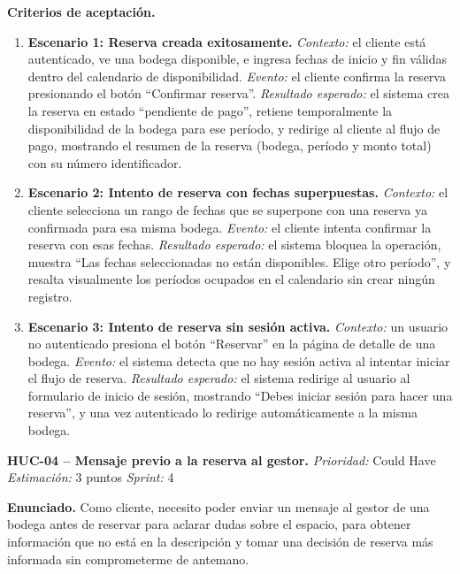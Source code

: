 \textbf{Criterios de aceptación.}
\begin{enumerate}
\item \textbf{Escenario 1: Reserva creada exitosamente.} \textit{Contexto:} el cliente está autenticado, ve una bodega disponible, e ingresa fechas de inicio y fin válidas dentro del calendario de disponibilidad. \textit{Evento:} el cliente confirma la reserva presionando el botón ``Confirmar reserva''. \textit{Resultado esperado:} el sistema crea la reserva en estado ``pendiente de pago'', retiene temporalmente la disponibilidad de la bodega para ese período, y redirige al cliente al flujo de pago, mostrando el resumen de la reserva (bodega, período y monto total) con su número identificador.
\item \textbf{Escenario 2: Intento de reserva con fechas superpuestas.} \textit{Contexto:} el cliente selecciona un rango de fechas que se superpone con una reserva ya confirmada para esa misma bodega. \textit{Evento:} el cliente intenta confirmar la reserva con esas fechas. \textit{Resultado esperado:} el sistema bloquea la operación, muestra ``Las fechas seleccionadas no están disponibles. Elige otro período'', y resalta visualmente los períodos ocupados en el calendario sin crear ningún registro.
\item \textbf{Escenario 3: Intento de reserva sin sesión activa.} \textit{Contexto:} un usuario no autenticado presiona el botón ``Reservar'' en la página de detalle de una bodega. \textit{Evento:} el sistema detecta que no hay sesión activa al intentar iniciar el flujo de reserva. \textit{Resultado esperado:} el sistema redirige al usuario al formulario de inicio de sesión, mostrando ``Debes iniciar sesión para hacer una reserva'', y una vez autenticado lo redirige automáticamente a la misma bodega.
\end{enumerate}

\textbf{HUC-04 -- Mensaje previo a la reserva al gestor.} \label{req:HUC-04}
\textit{Prioridad:} Could Have \quad \textit{Estimación:} 3 puntos \quad \textit{Sprint:} 4

\textbf{Enunciado.} Como cliente, necesito poder enviar un mensaje al gestor de una bodega antes de reservar para aclarar dudas sobre el espacio, para obtener información que no está en la descripción y tomar una decisión de reserva más informada sin comprometerme de antemano.

